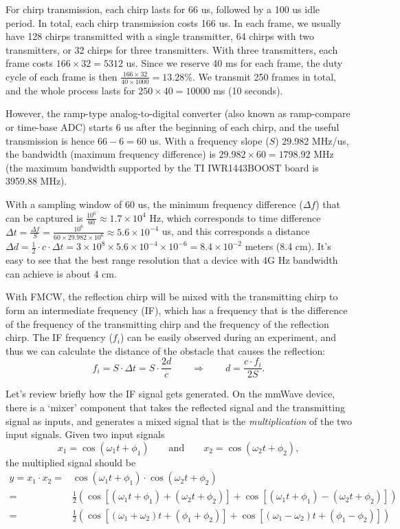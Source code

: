 \documentclass[11pt, oneside]{article}   	%
\begin{document}
For chirp transmission, each chirp lasts for 66 us, followed by a 100 us idle period. In total, each chirp transmission costs 166 us. In each frame, we usually have 128 chirps transmitted with a single transmitter, 64 chirps with two transmitters, or 32 chirps for three transmitters. With three transmitters, each frame costs $166\times 32 = 5312$ us. Since we reserve 40 ms for each frame, the duty cycle of each frame is then $\frac{166\times 32}{40\times 1000} = 13.28\%.$ We transmit 250 frames in total, and the whole process lasts for $250 \times 40 = 10000$ ms (10 seconds).

However, the ramp-type analog-to-digital converter (also known as ramp-compare or time-base ADC) starts 6 us after the beginning of each chirp, and the useful transmission is hence $66 - 6 = 60$ us. With a frequency slope ($S$) 29.982 MHz/us, the bandwidth (maximum frequency difference) is $29.982 \times 60 = 1798.92$ MHz (the maximum bandwidth supported by the TI IWR1443BOOST board is 3959.88 MHz).

With a sampling window of 60 us, the minimum frequency difference ($\Delta f$) that can be captured is $\frac{10^6}{60} \approx 1.7\times 10^4$ Hz, which corresponds to time difference $\Delta t = \frac{\Delta f}{S} = \frac{10^6}{60\times 29.982 \times 10^6} \approx 5.6\times 10^{-4}$ us, and this corresponds a distance $\Delta d = \frac{1}{2}\cdot c\cdot \Delta t = 3\times 10^8 \times 5.6\times 10^{-4}\times 10^{-6} = 8.4\times 10^{-2}$ meters (8.4 cm). It's easy to see that the best range resolution that a device with 4G Hz bandwidth can achieve is about 4 cm.

With FMCW, the reflection chirp will be mixed with the transmitting chirp to form an intermediate frequency (IF), which has a frequency that is the difference of the frequency of the transmitting chirp and the frequency of the reflection chirp. The IF frequency ($f_i$) can be easily observed during an experiment, and thus we can calculate the distance of the obstacle that causes the reflection: 
$$f_i = S\cdot \Delta t = S\cdot \frac{2d}{c} \qquad \Rightarrow \qquad d = \frac{c\cdot f_i}{2S}.$$

Let's review briefly how the IF signal gets generated. On the mmWave device, there is a `mixer'  component that takes the reflected signal and the transmitting signal as inputs, and generates a mixed signal that is the \emph{multiplication} of the two input signals. Given two input signals 
$$x_1 = \cos(\omega_1 t + \phi_1) \qquad \text{and}\qquad x_2 = \cos(\omega_2 t + \phi_2),$$
the multiplied signal should be 
\begin{align*}
y = x_1 \cdot x_2  = & \cos(\omega_1 t + \phi_1) \cdot \cos(\omega_2 t + \phi_2) \\
= & \frac{1}{2}\left(\cos\left[(\omega_1 t +\phi_1)+ (\omega_2 t +\phi_2)\right]+ \cos\left[(\omega_1 t +\phi_1)- (\omega_2 t +\phi_2)\right]\right)\\
= & \frac{1}{2}\left(\cos\left[(\omega_1 +\omega_2) t + (\phi_1 +\phi_2)\right]+ \cos\left[(\omega_1 - \omega_2) t + (\phi_1 - \phi_2)\right]\right)
\end{align*}
\end{document}
